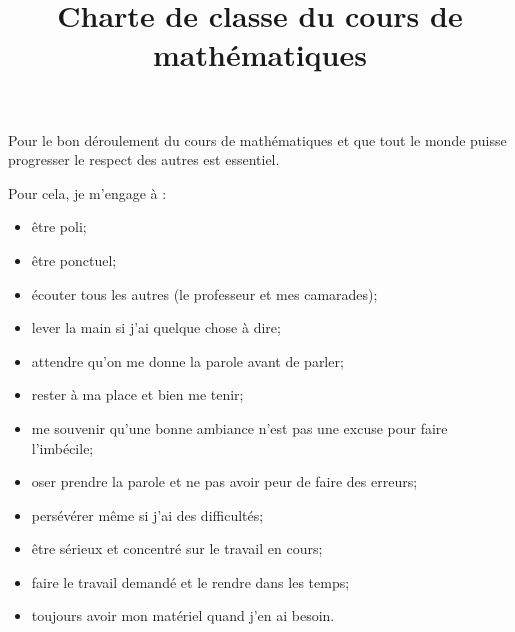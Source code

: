 \documentclass[a4paper, 14pt]{extarticle}
\author{}
\title{Charte de classe du cours de mathématiques}
\date{}
\begin{document}
\maketitle	
\thispagestyle{empty}

\vspace*{-1cm}
	

Pour le bon déroulement du cours de mathématiques et que tout le monde puisse progresser le respect des autres est essentiel.

\vspace*{1cm}

Pour cela, je m'engage à :

\begin{itemize}
	\item être poli;
	\item être ponctuel;
	\item écouter tous les autres (le professeur et mes camarades);
	\item lever la main si j'ai quelque chose à dire;
	\item attendre qu'on me donne la parole avant de parler;
	\item rester à ma place et bien me tenir;
	\item me souvenir qu'une bonne ambiance n'est pas une excuse pour faire l'imbécile;
	\item oser prendre la parole et ne pas avoir peur de faire des erreurs;
	\item persévérer même si j'ai des difficultés; 
	\item être sérieux et concentré sur le travail en cours;
	\item faire le travail demandé et le rendre dans les temps;
	\item toujours avoir mon matériel quand j'en ai besoin.
	
\end{itemize}
%
%	
\end{document}
